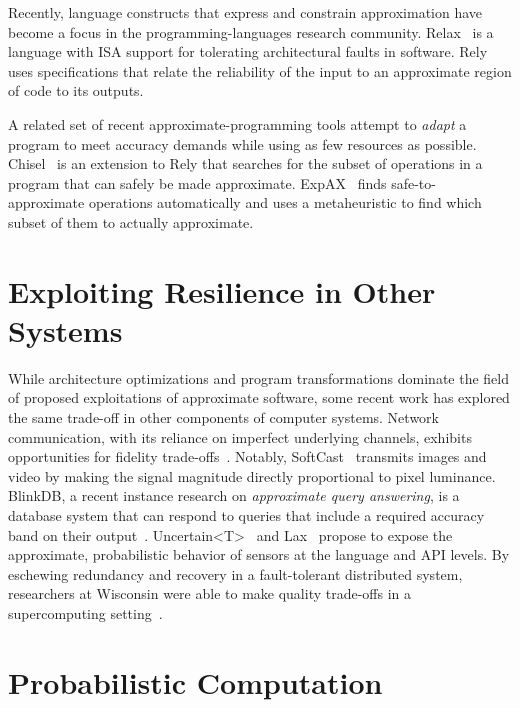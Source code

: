 Recently, language constructs that express and constrain
approximation have become a focus in the programming-languages research
community.
Relax~\cite{relax} is a language with ISA support for tolerating architectural
faults in software.
Rely~\cite{rely} uses specifications that relate the reliability of the input
to an approximate region of code to its outputs.

A related set of recent approximate-programming tools attempt to \emph{adapt}
a program to meet accuracy demands while using as few resources as possible.
Chisel~\cite{chisel} is an extension to Rely that searches for the subset of
operations in a program that can safely be made approximate.
ExpAX~\cite{expax-tr} finds safe-to-approximate operations automatically and
uses a metaheuristic to find which subset of them to actually approximate.




\section{Exploiting Resilience in Other Systems}

While architecture optimizations and program transformations dominate the
field of proposed exploitations of approximate software, some recent work has
explored the same trade-off in other components of computer systems. Network
communication, with its reliance on imperfect underlying channels, exhibits
opportunities for fidelity trade-offs~\cite{softcast, luo-globecom, apex,
smpmup2006}. Notably, SoftCast~\cite{softcast} transmits images and video by
making the signal magnitude directly proportional to pixel luminance. BlinkDB,
a recent instance research on \emph{approximate query answering},
is a database system that can respond to queries that include a required
accuracy band on their output~\cite{blinkdb}.
Uncertain{\textless}T{\textgreater}~\cite{uncertaint} and Lax~\cite{lax}
propose to expose the approximate, probabilistic behavior of sensors at the
language and API levels.
By eschewing redundancy and
recovery in a fault-tolerant distributed system, researchers at Wisconsin were
able to make quality trade-offs in a supercomputing
setting~\cite{dekruijf-icpp}.


\section{Probabilistic Computation}

